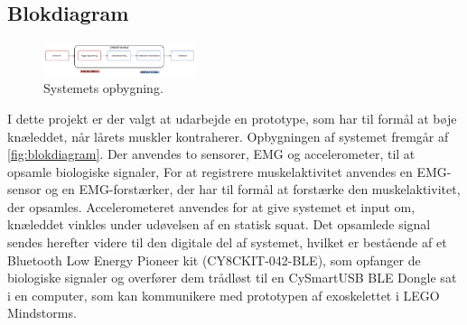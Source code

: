 
\subsection{Blokdiagram}
\begin{figure}[H]
\centering
\includegraphics[width=0.4\textwidth]{figures/blokdiagram.png}
\caption{Systemets opbygning.}
\label{fig:blokdiagram}
\end{figure}

I dette projekt er der valgt at udarbejde en prototype, som har til formål at bøje knæleddet, når lårets muskler kontraherer. Opbygningen af systemet fremgår af \autoref{fig:blokdiagram}. Der anvendes to sensorer, EMG og accelerometer, til at opsamle biologiske signaler, For at registrere muskelaktivitet anvendes en EMG-sensor og en EMG-forstærker, der har til formål at forstærke den muskelaktivitet, der opsamles. Accelerometeret anvendes for at give systemet et input om, knæleddet vinkles  under udøvelsen af en statisk squat. Det opsamlede signal sendes herefter videre til den digitale del af systemet, hvilket er bestående af et Bluetooth Low Energy Pioneer kit (CY8CKIT-042-BLE), som opfanger de biologiske signaler og overfører dem trådløst til en CySmartUSB BLE Dongle sat i en computer, som kan kommunikere med prototypen af exoskelettet i LEGO Mindstorms. 



